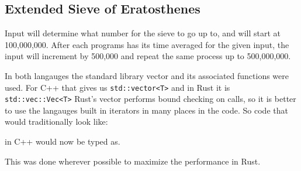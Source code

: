 \documentclass[10pt]{IEEEtran}
\begin{document}
\subsection{Extended Sieve of Eratosthenes}
Input will determine what number for the sieve to go up to, and will start at 100,000,000.
After each programs has its time averaged for the given input, the input will increment by 500,000 and repeat the same process up to 500,000,000.

% 
% 
% 
% 
% 
%         
% 
% 
%             
%         
% 

In both langauges the standard library vector and its associated functions were used.
For C++ that gives us \verb|std::vector<T>| and in Rust it is \verb|std::vec::Vec<T>| 
Rust's vector performs bound checking on calls, so 
it is better to use the langauges built in iterators in many places in 
the code. So code that would traditionally look like:

in C++ would now be typed as.

This was done wherever possible to maximize the performance in Rust.
\end{document}
